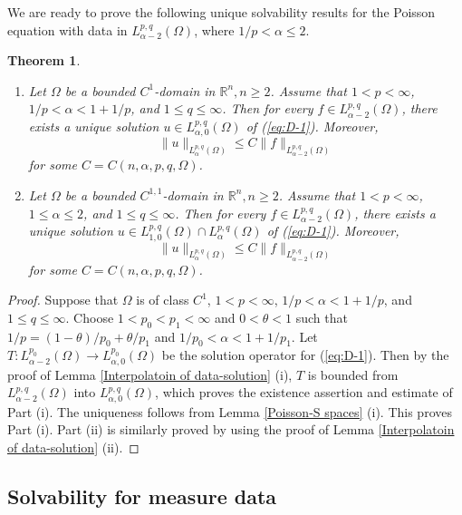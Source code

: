 \documentclass[reqno,centertags,11pt]{amsart}
\newtheorem{thm}{Theorem}
\theoremstyle{definition}
\numberwithin{thm}{section}
\numberwithin{equation}{section}
\newcommand{\R}{{\mathbb{R}}}
\begin{document}
We are ready to prove  the following  unique solvability results for the Poisson equation  with  data in $L_{\alpha-2}^{p,q}(\Omega )$, where $1/p< \alpha \le 2$.

\begin{thm}\label{Poisson-FSL spaces}
\begin{enumerate}[{\upshape(i)}]
\item  Let $\Omega$ be a bounded $C^1$-domain in $\R^n , n \ge 2  $. Assume that
$1<p<\infty$, $1/p <\alpha<1+ 1/p$, and $1 \le q \le \infty$.
Then for every $f\in L_{\alpha-2}^{p,q}(\Omega )$, there exists a unique solution $u\in L_{\alpha, 0}^{p,q}(\Omega )$ of (\ref{eq:D-1}).  Moreover,
\[
\|u\|_{L_{\alpha}^{p,q}(\Omega )} \le C \|f\|_{L_{\alpha-2}^{p,q}(\Omega )}
\]
for some $C=C(n,\alpha ,p, q, \Omega )$.
\item Let $\Omega$ be a bounded $C^{1,1}$-domain in $\R^n  , n \ge 2$. Assume that $1<p<\infty$, $ 1   \le \alpha \le 2$, and $1 \le q \le \infty$.
Then for every $f\in L_{\alpha-2}^{p,q}(\Omega )$, there exists a unique solution $u\in L_{1 , 0}^{p,q}(\Omega ) \cap L_{\alpha}^{p,q}(\Omega )$ of (\ref{eq:D-1}).  Moreover,
\[
\|u\|_{L_{\alpha}^{p,q}(\Omega )} \le C \|f\|_{L_{\alpha-2}^{p,q}(\Omega )}
\]
for some $C=C(n,\alpha ,p, q, \Omega )$.
\end{enumerate}
\end{thm}


\begin{proof}
Suppose that $\Omega$ is of class  $C^1$, $1<p<\infty$, $1/p <\alpha<1+ 1/p$, and $1 \le q \le \infty$. Choose $1<p_0 < p_1 <\infty$ and  $0< \theta < 1$ such that  $1/p=(1-\theta)/p_0 +\theta/p_1$ and  $1/p_0 <\alpha<1+ 1/p_1$.
Let   $T : L_{\alpha-2}^{p_0} (\Omega ) \to L_{\alpha,0}^{p_0} (\Omega )$ be the    solution operator for (\ref{eq:D-1}). Then by the proof of Lemma \ref{Interpolatoin of data-solution} (i),  $T$   is bounded from $L_{\alpha-2}^{p,q}(\Omega )$ into $L_{\alpha, 0}^{p,q}(\Omega )$, which  proves the existence   assertion and estimate of Part (i). The uniqueness follows from Lemma \ref{Poisson-S spaces} (i). This proves Part (i).  Part (ii) is similarly proved by using the proof of Lemma \ref{Interpolatoin of data-solution} (ii).
\end{proof}





\subsection{Solvability   for measure data}
\end{document}
